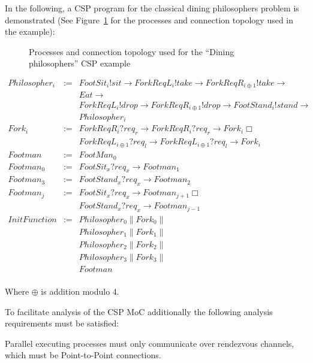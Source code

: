 In the following, a CSP program for the classical dining
philosophers problem is demonstrated (See Figure~\ref{fig:dining-philosophers}
for the processes and connection topology used in the example):

\begin{figure}[h]
\centering

\caption{Processes and connection topology used for the ``Dining philosophers'' CSP example}
\label{fig:dining-philosophers}
\end{figure}

\begin{displaymath}
\begin{array}{rcl}
Philosopher_{i}    & := & FootSit_{i}!sit \to ForkReqL_{i}!take \to ForkReqR_{i\oplus1}!take \to \\
		   &    & Eat \to \\
		   &    & ForkReqL_{i}!drop \to ForkReqR_{i\oplus1}!drop \to FootStand_{i}!stand \to \\
		   &	& Philosopher_{i} \\
Fork_{i}	   & := & ForkReqR_{i}?req_{r} \to ForkReqR_{i}?req_{r} \to Fork_{i} \Box \\
		   &    & ForkReqL_{i\oplus1}?req_{l} \to ForkReqL_{i\oplus1}?req_{l} \to Fork_{i} \\
Footman		   & := & FootMan_{0} \\
Footman_{0}	   & := & FootSit_{x}?req_{x} \to Footman_{1} \\
Footman_{3}	   & := & FootStand_{x}?req_{x} \to Footman_{2} \\
Footman_{j}	   & := & FootSit_{x}?req_{x} \to Footman_{j+1} \Box \\
		   &    & FootStand_{x}?req_{x} \to Footman_{j-1} \\
InitFunction       & := & Philosopher_{0} \| Fork_{0} \| \\
		   &    & Philosopher_{1} \| Fork_{1} \| \\
		   &    & Philosopher_{2} \| Fork_{2} \| \\
		   &    & Philosopher_{3} \| Fork_{3} \| \\
		   &    & Footman \\
\end{array}
\end{displaymath}

Where $\oplus$ is addition modulo 4.

To facilitate analysis of the CSP MoC additionally the following
analysis requirements must be satisfied:
\begin{requirement}\label{requirement-csp-communication}
  Parallel executing processes must only communicate over rendezvous channels,
  which must be Point-to-Point connections.
\end{requirement}

